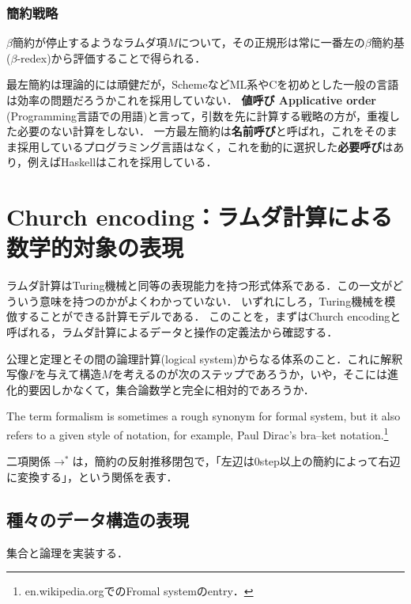 \documentclass[uplatex, 12pt, dvipdfmx]{jsreport}
\begin{document}
\subsubsection*{簡約戦略}

\begin{theorem}[最左簡約]
    $\beta$簡約が停止するようなラムダ項$M$について，その正規形は常に一番左の$\beta$簡約基($\beta$-redex)から評価することで得られる．
\end{theorem}
\begin{remark}[名前呼びと値呼びと必要呼び]
    最左簡約は理論的には頑健だが，SchemeなどML系やCを初めとした一般の言語は効率の問題だろうかこれを採用していない．
    \textbf{値呼び Applicative order} (Programming言語での用語)と言って，引数を先に計算する戦略の方が，重複した必要のない計算をしない．
    一方最左簡約は\textbf{名前呼び}と呼ばれ，これをそのまま採用しているプログラミング言語はなく，これを動的に選択した\textbf{必要呼び}はあり，例えばHaskellはこれを採用している．
\end{remark}

\section{Church encoding：ラムダ計算による数学的対象の表現}
ラムダ計算はTuring機械と同等の表現能力を持つ形式体系である．この一文がどういう意味を持つのかがよくわかっていない．
いずれにしろ，Turing機械を模倣することができる計算モデルである．
このことを，まずはChurch encodingと呼ばれる，ラムダ計算によるデータと操作の定義法から確認する．

\begin{definition}
    公理と定理とその間の論理計算(logical system)からなる体系のこと．これに解釈写像$F$を与えて構造$M$を考えるのが次のステップであろうか，いや，そこには進化的要因しかなくて，集合論数学と完全に相対的であろうか．
\end{definition}
\begin{remark}
    The term formalism is sometimes a rough synonym for formal system, but it also refers to a given style of notation, for example, Paul Dirac's bra–ket notation.\footnote{en.wikipedia.orgでのFromal systemのentry．}
\end{remark}

\begin{notation}
    二項関係$\to^*$は，簡約の反射推移閉包で，「左辺は0step以上の簡約によって右辺に変換する」，という関係を表す．
\end{notation}

\subsection{種々のデータ構造の表現}
集合と論理を実装する．
\end{document}
